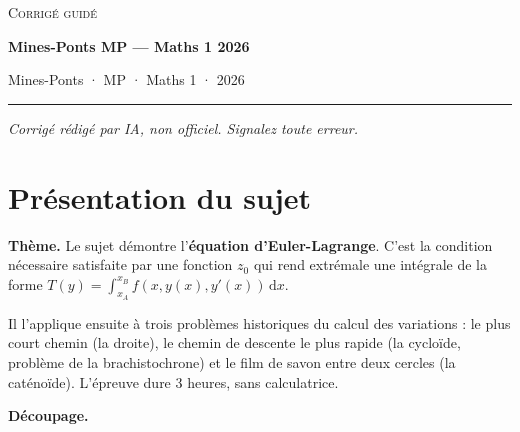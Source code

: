 \documentclass[11pt,a4paper]{article}
\begin{document}
\thispagestyle{plain}
\begin{center}
  {\small\scshape Corrigé guidé}\par\smallskip
  {\LARGE\bfseries Mines-Ponts MP — Maths 1 2026\par}\medskip
  {\large Mines-Ponts · MP · Maths 1 · 2026\par}
\end{center}
\vspace{2pt}\hrule\vspace{8pt}

\emph{Corrigé rédigé par IA, non officiel. Signalez toute erreur.}

\hypertarget{pruxe9sentation-du-sujet}{%
\section{Présentation du sujet}\label{pruxe9sentation-du-sujet}}

\textbf{Thème.} Le sujet démontre l'\textbf{équation d'Euler-Lagrange}. C'est la condition nécessaire satisfaite par une fonction \(z_0\) qui rend extrémale une intégrale de la forme \(T(y)=\int_{x_A}^{x_B}f(x,y(x),y'(x))\,\mathrm dx\).

Il l'applique ensuite à trois problèmes historiques du calcul des variations : le plus court chemin (la droite), le chemin de descente le plus rapide (la cycloïde, problème de la brachistochrone) et le film de savon entre deux cercles (la caténoïde). L'épreuve dure 3 heures, sans calculatrice.

\textbf{Découpage.}
\end{document}
